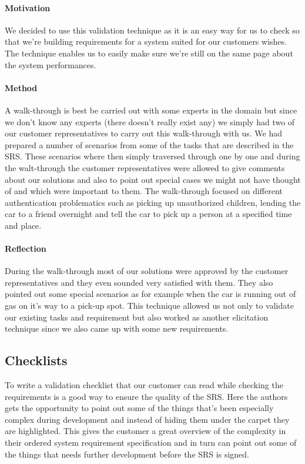 \documentclass[10pt]{article}
\begin{document}
\paragraph{Motivation}
\hfill \break
We decided to use this validation technique as it is an easy way for us to check so that we're building requirements for a system suited for our customers wishes. The technique enables us to easily make sure we're still on the same page about the system performances.

\paragraph{Method}
\hfill \break
A walk-through is best be carried out with some experts in the domain but since we don't know any experts (there doesn't really exist any) we simply had two of our customer representatives to carry out this walk-through with us.
We had prepared a number of scenarios from some of the tasks that are described in the SRS. These scenarios where then simply traversed through one by one and during the walt-through the customer representatives were allowed to give comments about our solutions and also to point out special cases we might not have thought of and which were important to them.
The walk-through focused on different authentication problematics such as picking up unauthorized children, lending the car to a friend overnight and tell the car to pick up a person at a specified time and place.
\paragraph{Reflection}
\hfill \break
During the walk-through most of our solutions were approved by the customer representatives and they even sounded very satisfied with them.
They also pointed out some special scenarios as for example when the car is running out of gas on it's way to a pick-up spot.
This technique allowed us not only to validate our existing tasks and requirement but also worked as another elicitation technique since we also came up with some new requirements.

\subsection{Checklists}
To write a validation checklist that our customer can read while checking the requirements is a good way to ensure the quality of the SRS. Here the authors gets the opportunity to point out some of the things that's been especially complex during development and instead of hiding them under the carpet they are highlighted. This gives the customer a great overview of the complexity in their ordered system requirement specification and in turn can point out some of the things that needs further development before the SRS is signed.
\end{document}
